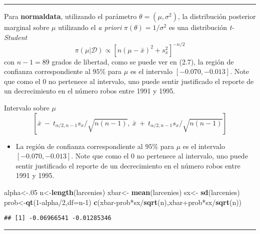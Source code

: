 \documentclass[12pt,]{article}
\newenvironment{Shaded}{\begin{snugshade}}{\end{snugshade}}
\newcommand{\KeywordTok}[1]{\textcolor[rgb]{0.13,0.29,0.53}{\textbf{{#1}}}}
\newcommand{\DataTypeTok}[1]{\textcolor[rgb]{0.13,0.29,0.53}{{#1}}}
\newcommand{\DecValTok}[1]{\textcolor[rgb]{0.00,0.00,0.81}{{#1}}}
\newcommand{\StringTok}[1]{\textcolor[rgb]{0.31,0.60,0.02}{{#1}}}
\newcommand{\NormalTok}[1]{{#1}}
\providecommand{\tightlist}{%
  \setlength{\itemsep}{0pt}\setlength{\parskip}{0pt}}
\begin{document}
\begin{center}\rule{0.5\linewidth}{\linethickness}\end{center}

Para \textbf{normaldata}, utilizando el parámetro
\(\theta=(\mu,\sigma^2)\), la distribución posterior marginal sobre
\(\mu\) utilizando el \emph{a priori} \(\pi(\theta)=1/\sigma^2\) es una
distribución \emph{t-Student} \[
\pi(\mu|\mathcal{D})\propto [n(\mu-\bar{x})^2+s_x^2]^{-n/2}
\] con \(n-1=89\) grados de libertad, como se puede ver en (2.7), la
región de confianza correspondiente al \(95\%\) para \(\mu\) es el
intervalo \([-0.070,-0.013]\). Note que como el \(0\) no pertenece al
intervalo, uno puede sentir justificado el reporte de un decrecimiento
en el número robos entre 1991 y 1995.

Intervalo sobre \(\mu\) \[
[\bar{x}\ -\ t_{\alpha/2,n-1}s_x/\sqrt{n(n-1)},\ \bar{x}\ +\ t_{\alpha/2,n-1}s_x/\sqrt{n(n-1)}]
\]

\begin{itemize}
\tightlist
\item
  La región de confianza correspondiente al \(95\%\) para \(\mu\) es el
  intervalo \([-0.070,-0.013]\). Note que como el \(0\) no pertenece al
  intervalo, uno puede sentir justificado el reporte de un decrecimiento
  en el número robos entre 1991 y 1995.
\end{itemize}

\begin{Shaded}
\begin{Highlighting}[]
\NormalTok{alpha<-.}\DecValTok{05}
\NormalTok{n<-}\KeywordTok{length}\NormalTok{(larcenies)}
\NormalTok{xbar<-}\StringTok{ }\KeywordTok{mean}\NormalTok{(larcenies)}
\NormalTok{sx<-}\StringTok{ }\KeywordTok{sd}\NormalTok{(larcenies)}
\NormalTok{prob<-}\KeywordTok{qt}\NormalTok{(}\DecValTok{1}\NormalTok{-alpha/}\DecValTok{2}\NormalTok{,}\DataTypeTok{df=}\NormalTok{n}\DecValTok{-1}\NormalTok{)}
\KeywordTok{c}\NormalTok{(xbar-prob*sx/}\KeywordTok{sqrt}\NormalTok{(n),xbar+prob*sx/}\KeywordTok{sqrt}\NormalTok{(n))}
\end{Highlighting}
\end{Shaded}

\begin{verbatim}
## [1] -0.06966541 -0.01285346
\end{verbatim}

\begin{center}\rule{0.5\linewidth}{\linethickness}\end{center}
\end{document}
